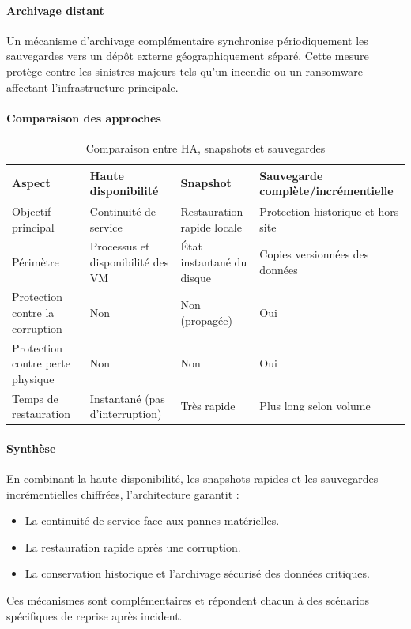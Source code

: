 \paragraph{Archivage distant}
Un mécanisme d’archivage complémentaire synchronise périodiquement les sauvegardes vers un dépôt externe géographiquement séparé. Cette mesure protège contre les sinistres majeurs tels qu’un incendie ou un ransomware affectant l’infrastructure principale.

\paragraph{Comparaison des approches}
\begin{table}[H]
	\renewcommand{\arraystretch}{1.3}
	\centering
	\begin{tabular}{|p{4cm}|p{4cm}|p{4cm}|p{4cm}|}
		\hline
		\textbf{Aspect}                  & \textbf{Haute disponibilité}      & \textbf{Snapshot}          & \textbf{Sauvegarde complète/incrémentielle} \\
		\hline
		Objectif principal               & Continuité de service             & Restauration rapide locale & Protection historique et hors site          \\
		\hline
		Périmètre                        & Processus et disponibilité des VM & État instantané du disque  & Copies versionnées des données              \\
		\hline
		Protection contre la corruption  & Non                               & Non (propagée)             & Oui                                         \\
		\hline
		Protection contre perte physique & Non                               & Non                        & Oui                                         \\
		\hline
		Temps de restauration            & Instantané (pas d’interruption)   & Très rapide                & Plus long selon volume                      \\
		\hline
	\end{tabular}
	\caption{Comparaison entre HA, snapshots et sauvegardes}
\end{table}

\paragraph{Synthèse}
En combinant la haute disponibilité, les snapshots rapides et les sauvegardes incrémentielles chiffrées, l’architecture garantit :
\begin{itemize}
	\item La continuité de service face aux pannes matérielles.
	\item La restauration rapide après une corruption.
	\item La conservation historique et l’archivage sécurisé des données critiques.
\end{itemize}
Ces mécanismes sont complémentaires et répondent chacun à des scénarios spécifiques de reprise après incident.